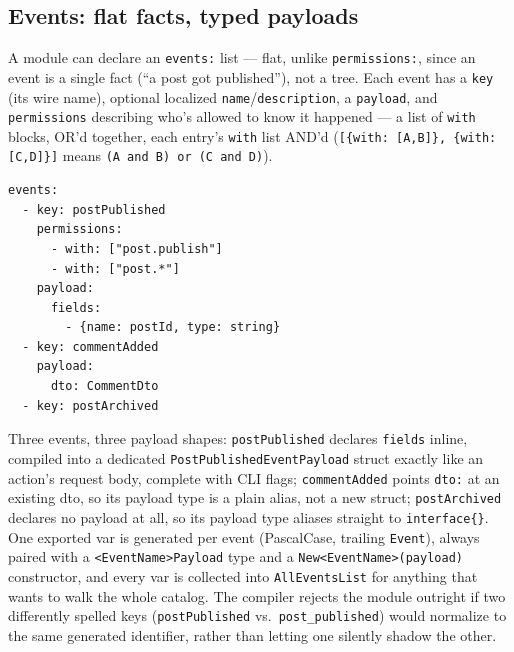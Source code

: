 \subsection{Events: flat facts, typed payloads}
A module can declare an \texttt{events:} list --- flat, unlike
\texttt{permissions:}, since an event is a single fact (``a post got
published''), not a tree. Each event has a \texttt{key} (its wire name),
optional localized \texttt{name}/\texttt{description}, a \texttt{payload},
and \texttt{permissions} describing who's allowed to know it happened ---
a list of \texttt{with} blocks, OR'd together, each entry's \texttt{with}
list AND'd (\texttt{[\{with: [A,B]\}, \{with: [C,D]\}]} means
\texttt{(A and B) or (C and D)}).

\begin{lstlisting}
events:
  - key: postPublished
    permissions:
      - with: ["post.publish"]
      - with: ["post.*"]
    payload:
      fields:
        - {name: postId, type: string}
  - key: commentAdded
    payload:
      dto: CommentDto
  - key: postArchived
\end{lstlisting}

Three events, three payload shapes: \texttt{postPublished} declares
\texttt{fields} inline, compiled into a dedicated
\texttt{PostPublishedEventPayload} struct exactly like an action's
request body, complete with CLI flags; \texttt{commentAdded} points
\texttt{dto:} at an existing dto, so its payload type is a plain alias,
not a new struct; \texttt{postArchived} declares no payload at all, so
its payload type aliases straight to \texttt{interface\{\}}. One exported
var is generated per event (PascalCase, trailing \texttt{Event}), always
paired with a \texttt{<EventName>Payload} type and a
\texttt{New<EventName>(payload)} constructor, and every var is collected
into \texttt{AllEventsList} for anything that wants to walk the whole
catalog. The compiler rejects the module outright if two differently
spelled keys (\texttt{postPublished} vs.\ \texttt{post\_published})
would normalize to the same generated identifier, rather than letting one
silently shadow the other.
